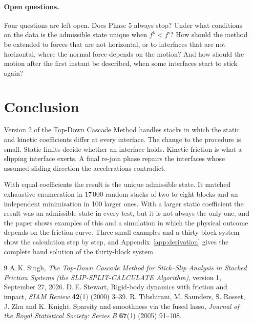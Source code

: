 \documentclass[11pt,a4paper]{article}
\newcommand{\fs}{f^{\mathrm{s}}}
\newcommand{\fkin}{f^{\mathrm{k}}}
\begin{document}
\paragraph{Open questions.} Four questions are left open. Does Phase 5 always stop? Under what conditions on the data is the admissible state unique when $\fkin<\fs$? How should the method be extended to forces that are not horizontal, or to interfaces that are not horizontal, where the normal force depends on the motion? And how should the motion after the first instant be described, when some interfaces start to stick again?

\section{Conclusion}\label{sec:conclusion}

Version 2 of the Top-Down Cascade Method handles stacks in which the static and kinetic coefficients differ at every interface. The change to the procedure is small. Static limits decide whether an interface holds. Kinetic friction is what a slipping interface exerts. A final re-join phase repairs the interfaces whose assumed sliding direction the accelerations contradict.

With equal coefficients the result is the unique admissible state. It matched exhaustive enumeration in 17\,000 random stacks of two to eight blocks and an independent minimisation in 100 larger ones. With a larger static coefficient the result was an admissible state in every test, but it is not always the only one, and the paper shows examples of this and a simulation in which the physical outcome depends on the friction curve. Three small examples and a thirty-block system show the calculation step by step, and Appendix~\ref{app:derivation} gives the complete hand solution of the thirty-block system.

\begin{thebibliography}{9}
 A.\,K. Singh, \emph{The Top-Down Cascade Method for Stick--Slip Analysis in Stacked Friction Systems (the SLIP-SPLIT-CALCULATE Algorithm)}, version 1, September 27, 2026.
 D.\,E. Stewart, Rigid-body dynamics with friction and impact, \emph{SIAM Review} \textbf{42}(1) (2000) 3--39.
 R. Tibshirani, M. Saunders, S. Rosset, J. Zhu and K. Knight, Sparsity and smoothness via the fused lasso, \emph{Journal of the Royal Statistical Society: Series B} \textbf{67}(1) (2005) 91--108.
\end{thebibliography}
\end{document}
